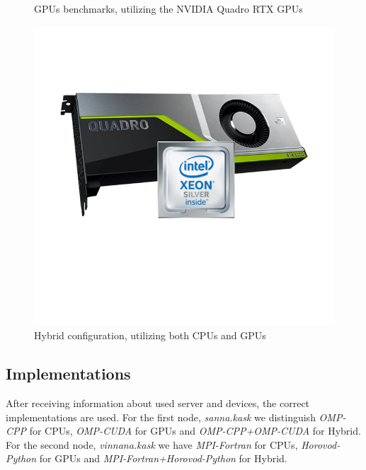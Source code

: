 \begin{figure}[hbt!]
\begin{minipage}[t]{0.3\textwidth}
        \caption{GPUs benchmarks, utilizing the NVIDIA Quadro RTX GPUs}\label{fig:NVIDIA_GPU}
    \end{minipage}\hfill
    \captionsetup{width=.3\linewidth}
    \begin{minipage}[t]{0.3\textwidth}
        \includegraphics[width=\textwidth]{figures/devices/Hybrid.png}
        \caption{Hybrid configuration, utilizing both CPUs and GPUs}\label{fig:Hybrid_Configuration}
    \end{minipage}
\end{figure}

\subsection{Implementations}
After receiving information about used server and devices,
the correct implementations are used. For the first node, \emph{sanna.kask}
we distinguish \emph{OMP-CPP} for CPUs, \emph{OMP-CUDA} for GPUs and
\emph{OMP-CPP+OMP-CUDA} for Hybrid. For the second node, \emph{vinnana.kask}
we have \emph{MPI-Fortran} for CPUs, \emph{Horovod-Python} for GPUs and
\emph{MPI-Fortran+Horovod-Python} for Hybrid.

